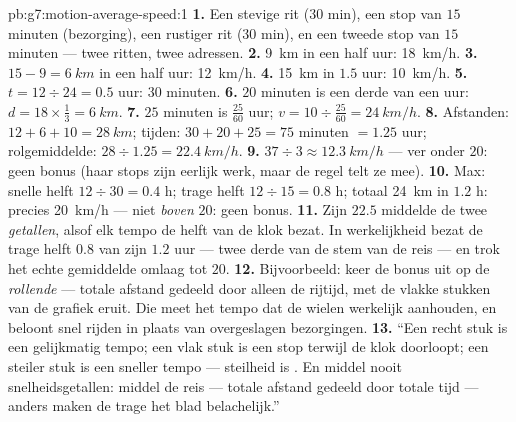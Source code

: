 \begin{solution}{pb:g7:motion-average-speed:1}
\textbf{1.} Een stevige rit ($30$ min), een stop van $15$ minuten
(bezorging), een rustiger rit ($30$ min), en een tweede stop van $15$
minuten --- twee ritten, twee adressen.
\textbf{2.} \qty{9}{km} in een half uur: \qty{18}{km/h}.
\textbf{3.} $15 - 9 = \qty{6}{km}$ in een half uur: \qty{12}{km/h}.
\textbf{4.} \qty{15}{km} in $1.5$ uur: \qty{10}{km/h}.
\textbf{5.} $t = 12 \div 24 = 0.5$ uur: $30$ minuten.
\textbf{6.} $20$ minuten is een derde van een uur: $d = 18 \times
\tfrac{1}{3} = \qty{6}{km}$.
\textbf{7.} $25$ minuten is $\tfrac{25}{60}$ uur; $v = 10
\div \tfrac{25}{60} = \qty{24}{km/h}$.
\textbf{8.} Afstanden: $12 + 6 + 10 = \qty{28}{km}$; tijden:
$30 + 20 + 25 = 75$ minuten $= 1.25$ uur; rolgemiddelde:
$28 \div 1.25 = \qty{22.4}{km/h}$.
\textbf{9.} $37 \div 3 \approx \qty{12.3}{km/h}$ --- ver onder $20$:
geen bonus (haar stops zijn eerlijk werk, maar de regel telt ze mee).
\textbf{10.} Max: snelle helft $12 \div 30 = 0.4$ h; trage helft
$12 \div 15 = 0.8$ h; totaal \qty{24}{km} in $1.2$ h: precies
\qty{20}{km/h} --- niet \emph{boven} $20$: geen bonus.
\textbf{11.} Zijn $22.5$ middelde de twee \emph{getallen}, alsof elk
tempo de helft van de klok bezat. In werkelijkheid bezat de trage helft
$0.8$ van zijn $1.2$ uur --- twee derde van de stem van de reis ---
en trok het echte gemiddelde omlaag tot $20$.
\textbf{12.} Bijvoorbeeld: keer de bonus uit op de \emph{rollende}
 --- totale afstand gedeeld door alleen de
rijtijd, met de vlakke stukken van de grafiek eruit. Die meet het
tempo dat de wielen werkelijk aanhouden, en beloont snel rijden in
plaats van overgeslagen bezorgingen.
\textbf{13.} ``Een recht stuk is een gelijkmatig tempo; een vlak stuk
is een stop terwijl de klok doorloopt; een steiler stuk is een sneller
tempo --- steilheid is . En middel nooit
snelheidsgetallen: middel de reis --- totale afstand gedeeld door
totale tijd --- anders maken de trage  het blad belachelijk.''
\end{solution}
